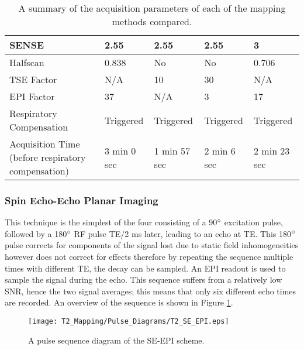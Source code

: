 \begin{table}[H]
\begin{adjustbox}{width=1.2\textwidth, center}
\begin{tabularx}{1.25\textwidth}{X|X|X|X|X}
		SENSE                                                & 2.55                            & 2.55                       & 2.55               & 3                   \\ \hline
		Halfscan                                             & 0.838                           & No                         & No                 & 0.706               \\ \hline
		TSE Factor                                           & N/A                             & 10                         & 30                 & N/A                 \\ \hline
		EPI Factor                                           & 37                              & N/A                        & 3                  & 17                  \\ \hline
		Respiratory Compensation                             & Triggered                       & Triggered                  & Triggered          & Triggered           \\ \hline
		Acquisition Time \tiny{(before respiratory compensation)} & 3 min 0 sec                & 1 min 57 sec               & 2 min 6 sec        & 2 min 23 sec  
	\end{tabularx}
	\end{adjustbox}
	\caption{A summary of the acquisition parameters of each of the \ttwo mapping methods compared.}
	\label{tab:t2_sequence_overview}
\end{table}

\subsubsection{Spin Echo-Echo Planar Imaging}
This technique is the simplest of the four consisting of a 90$\degree$ excitation pulse, followed by a 180$\degree$ \ac{RF} pulse \ac{TE}/2 ms later, leading to an echo at \ac{TE}. This 180$\degree$ pulse corrects for components of the signal lost due to static field inhomogeneities however does not correct for \ttwo effects therefore by repeating the sequence multiple times with different \ac{TE}, the \ttwo decay can be sampled. An \ac{EPI} readout is used to sample the signal during the echo. This sequence suffers from a relatively low \ac{SNR}, hence the two signal averages; this means that only six different echo times are recorded. An overview of the sequence is shown in Figure \ref{fig:t2_se-epi_seq}.

\begin{figure}[H]
	\centering
	\texttt{[image: T2\_Mapping/Pulse\_Diagrams/T2\_SE\_EPI.eps]}
	\caption{A pulse sequence diagram of the \ac{SE}-\ac{EPI} scheme.}
	\label{fig:t2_se-epi_seq}	
\end{figure}

